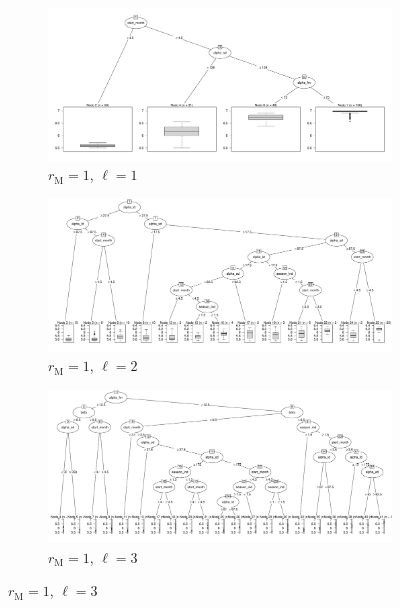 \documentclass[10pt]{article}
\theoremstyle{definition}
\newcommand{\mooreRange}{r_\mathrm{M}}
\begin{document}
\begin{figure}[!ht]
    \begin{subfigure}[b]{.45\textwidth}
\includegraphics[width=\textwidth,trim={1cm 1cm 1cm 0cm},clip]{../cellular_automata/results/cart/m1_l1_tree.pdf}
\caption{$\mooreRange=1$, $\ell=1$}
    \end{subfigure}
    \begin{subfigure}[b]{.45\textwidth}
\includegraphics[width=\textwidth,trim={1cm 1cm 1cm 0cm},clip]{../cellular_automata/results/cart/m1_l2_tree.pdf}
\caption{$\mooreRange=1$, $\ell=2$}
    \end{subfigure}
    \begin{subfigure}[b]{.45\textwidth}
\includegraphics[width=\textwidth,trim={1cm 1cm 1cm 0cm},clip]{../cellular_automata/results/cart/m1_l3_tree.pdf}
\caption{$\mooreRange=1$, $\ell=3$}

\end{subfigure}
\end{figure}
\end{document}
